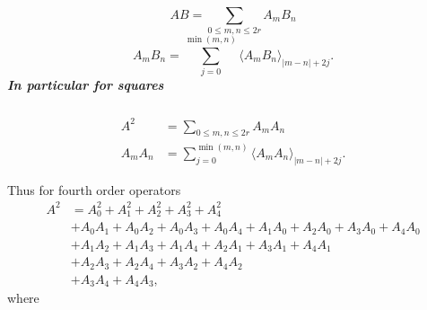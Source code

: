 \documentclass[aps, preprint]{revtex4}
\begin{document}
\subparagraph{\begin{equation}A B =\sum _{0 \leq m ,n \leq 2 r}A_{m} B_{n}
\end{equation}\begin{equation}A_{m} B_{n} =\sum _{j =0}^{\min \left (m ,n\right )} \langle A_{m} B_{n} \rangle _{\left \vert m -n\right \vert  +2 j}\text{.}
\end{equation}In particular for squares}
\begin{align}A^{2} &  =\sum _{0 \leq m ,n \leq 2 r}A_{m} A_{n} \\
A_{m} A_{n} &  =\sum _{j =0}^{\min \left (m ,n\right )} \langle A_{m} A_{n} \rangle _{\left \vert m -n\right \vert  +2 j}\text{.}\end{align}

Thus for fourth order operators
\begin{align}A^{2} &  =A_{0}^{2} +A_{1}^{2} +A_{2}^{2} +A_{3}^{2} +A_{4}^{2} \nonumber  \\
 &  +A_{0} A_{1} +A_{0} A_{2} +A_{0} A_{3} +A_{0} A_{4} +A_{1} A_{0} +A_{2} A_{0} +A_{3} A_{0} +A_{4} A_{0} \nonumber  \\
 &  +A_{1} A_{2} +A_{1} A_{3} +A_{1} A_{4} +A_{2} A_{1} +A_{3} A_{1} +A_{4} A_{1} \nonumber  \\
 &  +A_{2} A_{3} +A_{2} A_{4} +A_{3} A_{2} +A_{4} A_{2} \nonumber  \\
 &  +A_{3} A_{4} +A_{4} A_{3}\text{,}\end{align}where 
\end{document}

